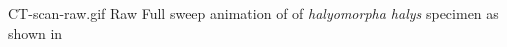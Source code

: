 \documentclass[../main.tex]{subfiles}%
\begin{document}
%
    \Xsupplement%
    \begin{supplement}%
        \supplementcaption%
            {CT-scan-raw.gif}%
            {Raw }%
            {Full sweep animation of  of \textit{halyomorpha halys} specimen as shown in }%
        \label{sup:ct-scan-raw}%
    \end{supplement}%
\end{document}
